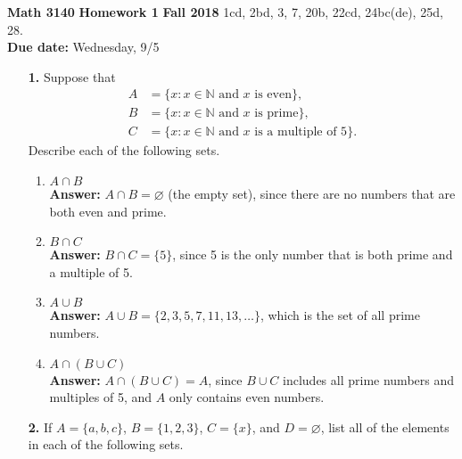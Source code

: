 \documentclass[12pt,reqno]{amsart}
\renewcommand{\emptyset}{\ensuremath{\varnothing}}
\begin{document}
\thispagestyle{empty}

\noindent \textbf{Math 3140} \hskip4cm {\bf Homework 1} \hfill {\bf Fall 2018}
\vskip1cm
  1cd, 2bd, 3, 7, 20b, 22cd, 24bc(de), 25d, 28.  \\
{\bf Due date:} Wednesday, 9/5

\medskip

\begin{enumerate}[{\bf 1.}]

\item[{\bf 1.}]
Suppose that
\begin{align*}
A & = \{ x : x \in \mathbb N \text{ and } x \text{ is even} \}, \\
B & = \{x : x \in \mathbb N \text{ and } x \text{ is prime}\}, \\
C & = \{ x : x \in \mathbb N \text{ and } x \text{ is a multiple of 5}\}.
\end{align*}
Describe each of the following sets. 
\begin{multicols}{2}
\begin{enumerate}

\item
$A \cap B$ \\
\textbf{Answer:} $A \cap B = \emptyset$ (the empty set), since there are no numbers that are both even and prime.

\item
$B \cap C$ \\
\textbf{Answer:} $B \cap C = \{5\}$, since 5 is the only number that is both prime and a multiple of 5.

\item
$A \cup B$ \\
\textbf{Answer:} $A \cup B = \{2, 3, 5, 7, 11, 13, \ldots\}$, which is the set of all prime numbers.

\item
$A \cap (B \cup C)$ \\
\textbf{Answer:} $A \cap (B \cup C) = A$, since $B \cup C$ includes all prime numbers and multiples of 5, and $A$ only contains even numbers.

\end{enumerate}
\end{multicols}

\medskip  

\item[{\bf 2.}]
If $A = \{ a, b, c \}$, $B = \{ 1, 2, 3 \}$, $C = \{ x \}$, and 
$D = \emptyset$, list all of the elements in each of the following sets. 
\begin{multicols}{2}
\begin{enumerate}


\end{enumerate}
\end{multicols}
\end{enumerate}
\end{document}

